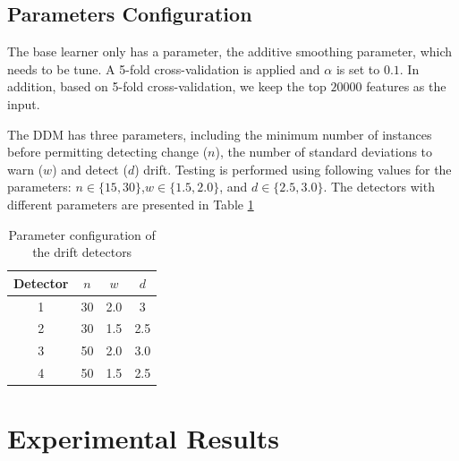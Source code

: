 \subsection{Parameters Configuration}
The base learner only has a parameter, the additive smoothing parameter, which needs to be tune. A 5-fold cross-validation is applied and $\alpha$ is set to $0.1$. In addition, based on 5-fold cross-validation, we keep the top $20000$ features as the input.

The DDM has three parameters, including the minimum number of instances before permitting detecting change ($n$), the number of standard deviations to warn ($w$) and detect ($d$) drift. Testing is performed using following values for the parameters: $n\in\{15,30\}$,$w\in\{1.5,2.0\}$, and $d\in\{2.5,3.0\}$. The detectors with different parameters are presented in Table \ref{para_config}


\begin{table}[]
\caption{Parameter configuration of the drift detectors}
\label{para_config}
\centering
\begin{tabular}{cccc}
Detector & $n$  & $w$   & $d$   \\ \hline
1        & 30 & 2.0 & 3   \\
2        & 30 & 1.5 & 2.5 \\
3        & 50 & 2.0 & 3.0 \\
4        & 50 & 1.5 & 2.5
\end{tabular}
\end{table}


\section{Experimental Results}

